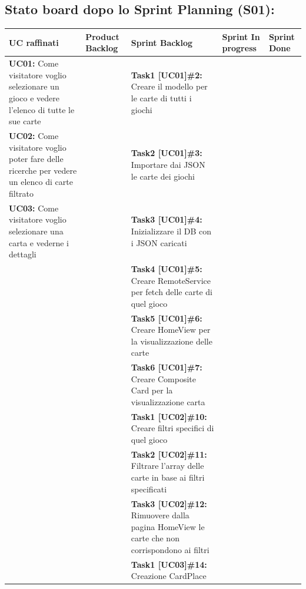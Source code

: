 \begin{landscape}
        \subsection{Stato board dopo lo Sprint Planning (S01):}
        \begin{itemize}
            \small
            \def\arraystretch{2}%
            \begin{tabular}{ | p{6cm} | p{3.2cm} | p{7.8cm} | p{3cm} | p{2.8cm}| }
                \hline
                \textbf{UC raffinati}
                & \textbf{Product Backlog}
                & \textbf{Sprint Backlog}
                & \textbf{Sprint In progress}
                & \textbf{Sprint Done} \\
                \hline
                \textbf{UC01:} Come visitatore voglio selezionare un gioco e vedere l'elenco di tutte le sue carte
                & & \textbf{Task1 [UC01]\#2:} Creare il modello per le carte di tutti i giochi & & \\
                \hline
                \textbf{UC02:} Come visitatore voglio poter fare delle ricerche per vedere un elenco di carte filtrato
                & & \textbf{Task2 [UC01]\#3:} Importare dai JSON le carte dei giochi & & \\
                \hline
                \textbf{UC03:} Come visitatore voglio selezionare una carta e vederne i dettagli
                & & \textbf{Task3 [UC01]\#4:} Inizializzare il DB con i JSON caricati & & \\
                \hline
                & & \textbf{Task4 [UC01]\#5:} Creare RemoteService per fetch delle carte di quel gioco & & \\
                \hline
                & & \textbf{Task5 [UC01]\#6:} Creare HomeView per la visualizzazione delle carte & & \\
                \hline
                & & \textbf{Task6 [UC01]\#7:} Creare Composite Card per la visualizzazione carta & & \\
                \hline
                & & \textbf{Task1 [UC02]\#10:} Creare filtri specifici di quel gioco & & \\
                \hline
                & & \textbf{Task2 [UC02]\#11:} Filtrare l'array delle carte in base ai filtri specificati & & \\
                \hline
                & & \textbf{Task3 [UC02]\#12:} Rimuovere dalla pagina HomeView le carte che non corrispondono ai filtri & & \\
                \hline
                & & \textbf{Task1 [UC03]\#14:} Creazione CardPlace & & \\

\end{tabular}
\end{itemize}
\end{landscape}
